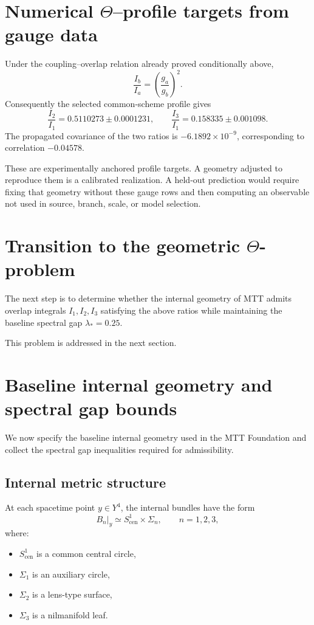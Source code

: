 \documentclass[11pt]{article}
\begin{document}
\section{Numerical $\Theta$--profile targets from gauge data}

Under the coupling--overlap relation already proved conditionally above,
\[
 \frac{I_b}{I_a}=\left(\frac{g_a}{g_b}\right)^2.
\]
Consequently the selected common-scheme profile gives
\begin{equation}
\boxed{
 \frac{I_2}{I_1}=0.5110273\pm0.0001231,
 \qquad
 \frac{I_3}{I_1}=0.158335\pm0.001098.
}
\label{eq:targets}
\end{equation}
The propagated covariance of the two ratios is
$-6.1892\times10^{-9}$, corresponding to correlation $-0.04578$.

These are experimentally anchored profile targets.  A geometry adjusted to
reproduce them is a calibrated realization.  A held-out prediction would
require fixing that geometry without these gauge rows and then computing an
observable not used in source, branch, scale, or model selection.

\section{Transition to the geometric $\Theta$-problem}

The next step is to determine whether the internal geometry of MTT
admits overlap integrals $I_1,I_2,I_3$ satisfying the above ratios
while maintaining the baseline spectral gap $\lambda_{\ast}=0.25$.

This problem is addressed in the next section.
\section{Baseline internal geometry and spectral gap bounds}

We now specify the baseline internal geometry used in the MTT Foundation
and collect the spectral gap inequalities required for admissibility.

\subsection{Internal metric structure}

At each spacetime point $y\in Y^4$, the internal bundles have the form
\[
B_n|_y \simeq S^1_{\mathrm{cen}} \times \Sigma_n,
\qquad n=1,2,3,
\]
where:
\begin{itemize}
\item $S^1_{\mathrm{cen}}$ is a common central circle,
\item $\Sigma_1$ is an auxiliary circle,
\item $\Sigma_2$ is a lens-type surface,
\item $\Sigma_3$ is a nilmanifold leaf.
\end{itemize}
\end{document}
